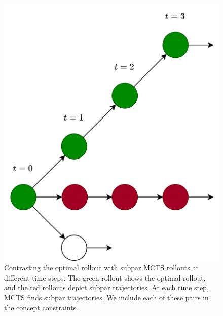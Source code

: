 \documentclass{article}
\begin{document}
\begin{figure}[h] 
\centering
\caption{Contrasting the optimal rollout with subpar MCTS rollouts at different time steps. The green rollout shows the optimal rollout, and the red rollouts depict subpar trajectories. At each time step, MCTS finds subpar trajectories. We include each of these pairs in the concept constraints.}
\begin{minipage}{0.3\textwidth}
\includegraphics[width=\textwidth]{images/t0mcts.png}
\end{minipage}
\hspace{0.03\textwidth}
\begin{minipage}{0.3\textwidth}
\vspace{-0.223\textwidth}

\end{minipage}
\end{figure}
\end{document}
